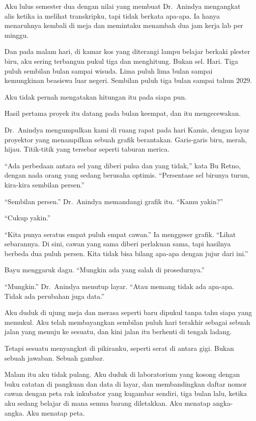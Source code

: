 \documentclass[11pt,twoside,openany]{book}
\makeatletter
\newcommand{\scenebreak}{\par\vspace{0.9em}{\centering\textsc{*\hspace{0.7em}*\hspace{0.7em}*}\par}\vspace{0.9em}\@afterindentfalse\@afterheading}
\makeatother
\begin{document}
Aku lulus semester dua dengan nilai yang membuat Dr.~Anindya mengangkat alis ketika ia melihat transkripku, tapi tidak berkata apa-apa. Ia hanya menaruhnya kembali di meja dan memintaku menambah dua jam kerja lab per minggu.

Dan pada malam hari, di kamar kos yang diterangi lampu belajar berkaki plester biru, aku sering terbangun pukul tiga dan menghitung. Bukan sel. Hari. Tiga puluh sembilan bulan sampai wisuda. Lima puluh lima bulan sampai kemungkinan beasiswa luar negeri. Sembilan puluh tiga bulan sampai tahun 2029.

Aku tidak pernah mengatakan hitungan itu pada siapa pun.

\scenebreak
Hasil pertama proyek itu datang pada bulan keempat, dan itu mengecewakan.

Dr.~Anindya mengumpulkan kami di ruang rapat pada hari Kamis, dengan layar proyektor yang menampilkan sebuah grafik berantakan. Garis-garis biru, merah, hijau. Titik-titik yang tersebar seperti taburan merica.

``Ada perbedaan antara sel yang diberi pulsa dan yang tidak,'' kata Bu Retno, dengan nada orang yang sedang berusaha optimis. ``Persentase sel birunya turun, kira-kira sembilan persen.''

``Sembilan persen.'' Dr.~Anindya memandangi grafik itu. ``Kamu yakin?''

``Cukup yakin.''

``Kita punya seratus empat puluh empat cawan.'' Ia menggeser grafik. ``Lihat sebarannya. Di sini, cawan yang sama diberi perlakuan sama, tapi hasilnya berbeda dua puluh persen. Kita tidak bisa bilang apa-apa dengan jujur dari ini.''

Bayu menggaruk dagu. ``Mungkin ada yang salah di prosedurnya.''

``Mungkin.'' Dr.~Anindya menutup layar. ``Atau memang tidak ada apa-apa. Tidak ada perubahan juga data.''

Aku duduk di ujung meja dan merasa seperti baru dipukul tanpa tahu siapa yang memukul. Aku telah membayangkan sembilan puluh hari terakhir sebagai sebuah jalan yang menuju ke sesuatu, dan kini jalan itu berhenti di tengah ladang.

Tetapi sesuatu menyangkut di pikiranku, seperti serat di antara gigi. Bukan sebuah jawaban. Sebuah gambar.

Malam itu aku tidak pulang. Aku duduk di laboratorium yang kosong dengan buku catatan di pangkuan dan data di layar, dan membandingkan daftar nomor cawan dengan peta rak inkubator yang kugambar sendiri, tiga bulan lalu, ketika aku sedang belajar di mana semua barang diletakkan. Aku menatap angka-angka. Aku menatap peta.
\end{document}
